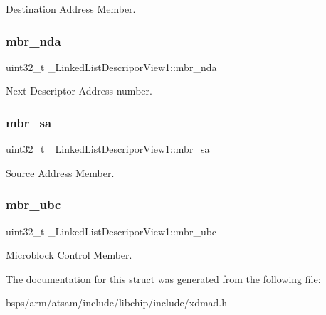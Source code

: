 Destination Address Member. \mbox{\label{struct__LinkedListDescriporView1_a6b3df276ecc149cd8584551a05d0c84c}} 
\subsubsection{\texorpdfstring{mbr\_nda}{mbr\_nda}}
{\footnotesize\ttfamily uint32\+\_\+t \+\_\+\+Linked\+List\+Descripor\+View1\+::mbr\+\_\+nda}

Next Descriptor Address number. \mbox{\label{struct__LinkedListDescriporView1_ac8df8439663ea19820f9a8ae4e69b2bb}} 
\subsubsection{\texorpdfstring{mbr\_sa}{mbr\_sa}}
{\footnotesize\ttfamily uint32\+\_\+t \+\_\+\+Linked\+List\+Descripor\+View1\+::mbr\+\_\+sa}

Source Address Member. \mbox{\label{struct__LinkedListDescriporView1_af018fba1d23fef8a49de0422db871dae}} 
\subsubsection{\texorpdfstring{mbr\_ubc}{mbr\_ubc}}
{\footnotesize\ttfamily uint32\+\_\+t \+\_\+\+Linked\+List\+Descripor\+View1\+::mbr\+\_\+ubc}

Microblock Control Member. 

The documentation for this struct was generated from the following file\+:\begin{DoxyCompactItemize}
\item 
bsps/arm/atsam/include/libchip/include/xdmad.\+h\end{DoxyCompactItemize}
